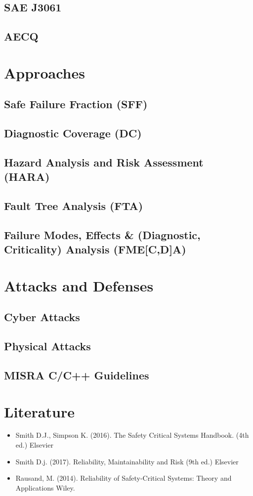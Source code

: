     \subsection{SAE J3061}
    \subsection{AECQ}
    \section{Approaches}
    \subsection{Safe Failure Fraction (SFF)}
    \subsection{Diagnostic Coverage (DC)}
    \subsection{Hazard Analysis and Risk Assessment (HARA)}
    \subsection{Fault Tree Analysis (FTA)}
    \subsection{Failure Modes, Effects \& (Diagnostic, Criticality) Analysis (FME[C,D]A)}
    \section{Attacks and Defenses}
    \subsection{Cyber Attacks}
    \subsection{Physical Attacks}
    \subsection{MISRA C/C++ Guidelines}

    \section{Literature}
    \begin{itemize}
        \item Smith D.J., Simpson K. (2016). The Safety Critical Systems Handbook. (4th ed.) Elsevier
        \item Smith D.j. (2017). Reliability, Maintainability and Risk (9th ed.) Elsevier
        \item Rausand, M. (2014). Reliability of Safety-Critical Systems: Theory and Applications Wiley.
    \end{itemize}

